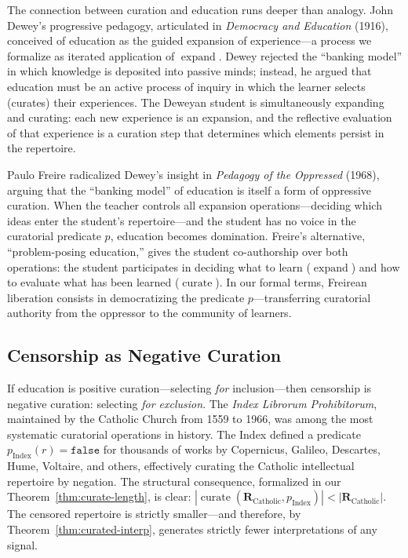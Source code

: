 The connection between curation and education runs deeper than analogy.
John Dewey's progressive pedagogy, articulated in \textit{Democracy and
Education} (1916), conceived of education as the guided expansion of
experience---a process we formalize as iterated application of
$\operatorname{expand}$.  Dewey rejected the ``banking model'' in which
knowledge is deposited into passive minds; instead, he argued that
education must be an active process of inquiry in which the learner
selects (curates) their experiences.  The Deweyan student is simultaneously
expanding and curating: each new experience is an expansion, and the
reflective evaluation of that experience is a curation step that
determines which elements persist in the repertoire.

Paulo Freire radicalized Dewey's insight in \textit{Pedagogy of the
Oppressed} (1968), arguing that the ``banking model'' of education is
itself a form of oppressive curation.  When the teacher controls all
expansion operations---deciding which ideas enter the student's
repertoire---and the student has no voice in the curatorial predicate $p$,
education becomes domination.  Freire's alternative, ``problem-posing
education,'' gives the student co-authorship over both operations:
the student participates in deciding what to learn
($\operatorname{expand}$) and how to evaluate what has been learned
($\operatorname{curate}$).  In our formal terms, Freirean liberation
consists in democratizing the predicate $p$---transferring curatorial
authority from the oppressor to the community of learners.

\subsection*{Censorship as Negative Curation}

If education is positive curation---selecting \emph{for} inclusion---then
censorship is negative curation: selecting \emph{for exclusion}.  The
\textit{Index Librorum Prohibitorum}, maintained by the Catholic Church
from 1559 to 1966, was among the most systematic curatorial operations
in history.  The Index defined a predicate
$p_{\text{Index}}(r) = \texttt{false}$ for thousands of works by
Copernicus, Galileo, Descartes, Hume, Voltaire, and others, effectively
curating the Catholic intellectual repertoire by negation.  The structural
consequence, formalized in our Theorem~\ref{thm:curate-length}, is
clear: $|\operatorname{curate}(\mathbf{R}_{\text{Catholic}},
p_{\text{Index}})| < |\mathbf{R}_{\text{Catholic}}|$.  The censored
repertoire is strictly smaller---and therefore, by
Theorem~\ref{thm:curated-interp}, generates strictly fewer
interpretations of any signal.

